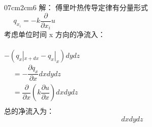 \begin{frame}
	\frametitle{}
	~~~\hspace*{\fill} \\	
	~~~\hspace*{\fill} \\	
	\opencutright 
	\def\windowpagestuff{\flushright 
	\begin{tikzpicture}[math3d]
			\def\k{1.4}
			\draw [ ->] (-\k,-\k,-\k) --  (\k,-\k,-\k)  node[below] {$z$};
			\draw [ ->]  (-\k,-\k,-\k) -- (-\k, \k,-\k)   node[above] {$x$};
			\draw [ ->]  (-\k,-\k,-\k) -- (-\k,-\k, \k)    node[left] {$y$};
			\def\a{0.5}
			\def\b{0.5}
			\def\c{0.5}
			\coordinate (A01) at ( \a, \b, \c);
			\coordinate (A02) at ( \a,-\b, \c);
			\coordinate (A03) at (-\a,-\b, \c);
			\coordinate (A04) at (-\a, \b, \c);
			\coordinate (A05) at ( \a, \b,-\c);
			\coordinate (A06) at ( \a,-\b,-\c);
			\coordinate (A07) at (-\a,-\b,-\c);
			\coordinate (A08) at (-\a, \b,-\c);
			\draw(A01)--(A02)--(A03)--(A04)--cycle;
			\draw(A06)--(A05)--(A08);
			\draw[dash dot](A06)--(A07)--(A08);
			\draw(A01)--(A05)(A02)--(A06)(A04)--(A08);
			\draw[dash dot](A03)--(A07);
			\draw[line width =1pt]  (-\k,-1,-\k) node[below] {$x$}-- (-\k, 0.0,-\k)  node[below] {$x+dx$}; 
	\end{tikzpicture}}	
	\begin{cutout} {0}{7cm}{2cm}{6}
		\alert{解：}
		傅里叶热传导定律有分量形式 \\
		$~~~~~~q_{x_i}=-k \dfrac{\partial }{\partial x_{i}} u$ \\
		考虑单位时间 x 方向的净流入：\\
		~~~\hspace*{\fill} \\	
		$\displaystyle- (q_x|_{x+dx}-q_x|_x)dydz$ \\
		$\begin{array}{llll}
			&=-\dfrac{\partial q_x }{\partial x}  dxdydz\\
			&= \dfrac{\partial }{\partial x} (k\dfrac{\partial u}{\partial x})dxdydz \\
		\end{array}$ \\   
		总的净流入为：
		\begin{equation*}
			[\frac{\partial }{\partial x} (k_x\frac{\partial u}{\partial x}) + \frac{\partial }{\partial y} (k_y\frac{\partial u}{\partial y}) + \frac{\partial }{\partial z} (k_z\frac{\partial u}{\partial z}) ]dxdydz 
		\end{equation*}
	\end{cutout} 	
\end{frame}	

